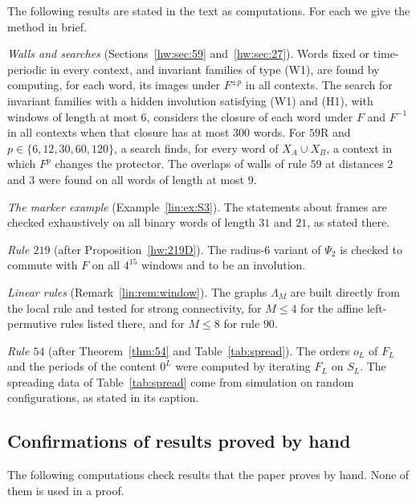 The following results are stated in the text as computations. For each we give the method in brief.

\emph{Walls and searches} (Sections~\ref{hw:sec:59} and~\ref{hw:sec:27}). Words fixed or time-periodic in every context, and invariant families of type (W1), are found by computing, for each word, its images under $F^{\pm p}$ in all contexts. The search for invariant families with a hidden involution satisfying (W1) and (H1), with windows of length at most $6$, considers the closure of each word under $F$ and $F^{-1}$ in all contexts when that closure has at most $300$ words. For $59$R and $p\in\{6,12,30,60,120\}$, a search finds, for every word of $X_A\cup X_B$, a context in which $F^p$ changes the protector. The overlaps of walls of rule $59$ at distances $2$ and $3$ were found on all words of length at most $9$.

\emph{The marker example} (Example~\ref{lin:ex:S3}). The statements about frames are checked exhaustively on all binary words of length $31$ and $21$, as stated there.

\emph{Rule $219$} (after Proposition~\ref{hw:219D}). The radius-$6$ variant of $\Psi_2$ is checked to commute with $F$ on all $4^{15}$ windows and to be an involution.

\emph{Linear rules} (Remark~\ref{lin:rem:window}). The graphs $\Lambda_M$ are built directly from the local rule and tested for strong connectivity, for $M\le4$ for the affine left-permutive rules listed there, and for $M\le8$ for rule $90$.

\emph{Rule $54$} (after Theorem~\ref{thm:54} and Table~\ref{tab:spread}). The orders $o_L$ of $F_L$ and the periods of the content $0^L$ were computed by iterating $F_L$ on $S_L$. The spreading data of Table~\ref{tab:spread} come from simulation on random configurations, as stated in its caption.

\subsection{Confirmations of results proved by hand}\label{app:confirm}

The following computations check results that the paper proves by hand. None of them is used in a proof.


